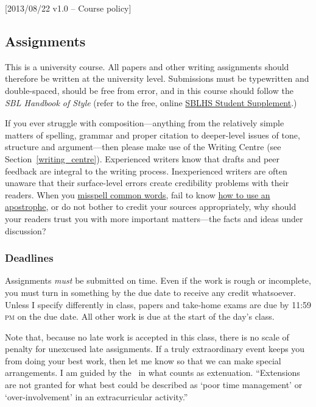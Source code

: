 [2013/08/22 v1.0 -- Course policy]

\subsection{Assignments}
\label{assignments}

This is a university course. All papers and other writing assignments
should therefore be written at the university level. Submissions must be
typewritten and double-spaced, should be free from error, and in this course
should follow the \emph{SBL Handbook of Style} (refer to the free, online
\href{http://www.sbl-site.org/assets/pdfs/sblhs_ss92804_revised_ed.pdf}{SBLHS
Student Supplement}.)

If you ever struggle with composition---anything from the relatively simple
matters of spelling, grammar and proper citation to deeper-level issues of
tone, structure and argument---then please make use of the Writing Centre (see
Section~\ref{writing_centre}). Experienced writers know that drafts and peer
feedback are integral to the writing process. Inexperienced writers are often
unaware that their surface-level errors create credibility problems with their
readers. When you \href{http://theoatmeal.com/comics/misspelling}{misspell
common words}, fail to know \href{http://theoatmeal.com/comics/apostrophe}{how
to use an apostrophe}, or do not bother to credit your sources appropriately,
why should your readers trust you with more important matters---the facts and
ideas under discussion?

\subsubsection{Deadlines}
\label{deadlines}

Assignments \emph{must} be submitted on time. Even if the work is rough or
incomplete, you must turn in something by the due date to receive any credit
whatsoever. Unless I specify differently in class, papers and take-home exams
are due by 11:59 \textsc{pm} on the due date. All other work is due at the
start of the day's class.

Note that, because no late work is accepted in this class, there is no scale
of penalty for unexcused late assignments. If a truly extraordinary event
keeps you from doing your best work, then let me know so that we can make
special arrangements. I am guided by the \AC\ in what counts as extenuation.
``Extensions are not granted for what best could be described as `poor time
management' or `over-involvement' in an extracurricular activity.''


